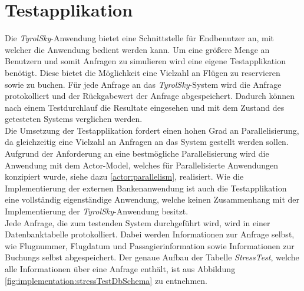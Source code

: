 \section{Testapplikation}
\label{subsec:implementation:TestApplikation} 
Die \textit{TyrolSky}-Anwendung bietet eine Schnittstelle für Endbenutzer an, mit welcher die Anwendung bedient werden kann. Um eine größere Menge an Benutzern und somit Anfragen zu simulieren wird eine eigene Testapplikation benötigt. Diese bietet die Möglichkeit eine Vielzahl an Flügen zu reservieren sowie zu buchen. Für jede Anfrage an das \textit{TyrolSky}-System wird die Anfrage protokolliert und der Rückgabewert der Anfrage abgespeichert. Dadurch können nach einem Testdurchlauf die Resultate eingesehen und mit dem Zustand des getesteten Systems verglichen werden. \\
Die Umsetzung der Testapplikation fordert einen hohen Grad an Parallelisierung, da gleichzeitig eine Vielzahl an Anfragen an das System gestellt werden sollen. Aufgrund der Anforderung an eine bestmögliche Parallelisierung wird die Anwendung mit dem Actor-Model, welches für Parallelisierte Anwendungen konzipiert wurde, siehe dazu \ref{actor:parallelism}, realisiert. Wie die Implementierung der externen Bankenanwendung ist auch die Testapplikation eine vollständig eigenständige Anwendung, welche keinen Zusammenhang mit der Implementierung der \textit{TyrolSky}-Anwendung besitzt. \\
Jede Anfrage, die zum testenden System durchgeführt wird, wird in einer Datenbanktabelle protokolliert. Dabei werden Informationen zur Anfrage selbst, wie Flugnummer, Flugdatum und Passagierinformation sowie Informationen zur Buchungs selbst abgespeichert. Der genaue Aufbau der Tabelle \textit{StressTest}, welche alle Informationen über eine Anfrage enthält, ist aus Abbildung \ref{fig:implementation:stressTestDbSchema} zu entnehmen.
% 
% 
% 
